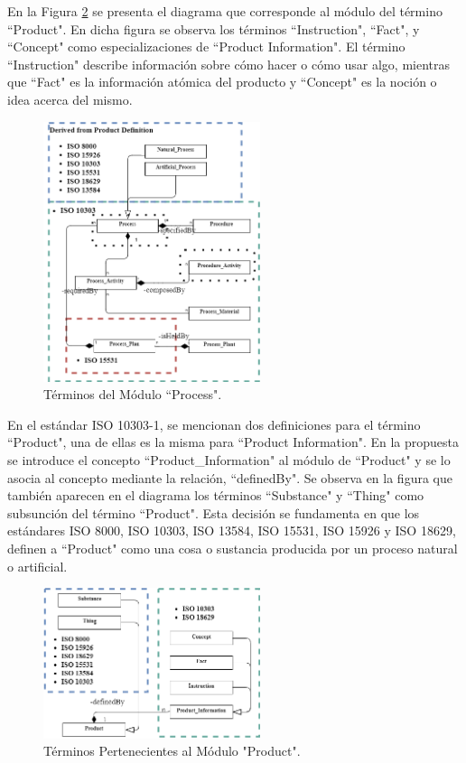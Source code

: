 \documentclass[journal]{IEEEtran}
\begin{document}
En la Figura \ref{fig5} se presenta el diagrama que corresponde al m\'odulo del t\'ermino ``Product". En dicha figura se observa los t\'erminos ``Instruction", ``Fact", y ``Concept" como especializaciones de ``Product Information". El t\'ermino ``Instruction" describe informaci\'on sobre c\'omo hacer o c\'omo usar algo, mientras que ``Fact" es la informaci\'on at\'omica del producto y ``Concept" es la noci\'on o idea acerca del mismo.

\begin{figure}[!t]
\centering
\includegraphics[width=2.5in]{figures/figure4.png}
\caption{T\'erminos del M\'odulo ``Process".}
\label{fig4}
\end{figure}

En el est\'andar ISO 10303-1, se mencionan dos definiciones para el t\'ermino ``Product", una de ellas es la misma para ``Product Information". En la propuesta se introduce el concepto ``Product\_Information" al m\'odulo de ``Product" y se lo asocia al concepto mediante la relaci\'on, ``definedBy". Se observa en la figura que tambi\'en aparecen en el diagrama los t\'erminos ``Substance" y ``Thing" como subsunci\'on del t\'ermino ``Product". Esta decisi\'on se fundamenta en que los est\'andares ISO 8000, ISO 10303, ISO 13584, ISO 15531, ISO 15926 y ISO 18629, definen a ``Product" como una cosa o sustancia producida por un proceso natural o artificial.

\begin{figure}[!t]
\centering
\includegraphics[width=2.5in]{figures/figure5.png}
\caption{T\'erminos Pertenecientes al M\'odulo "Product".}
\label{fig5}
\end{figure}
\end{document}

